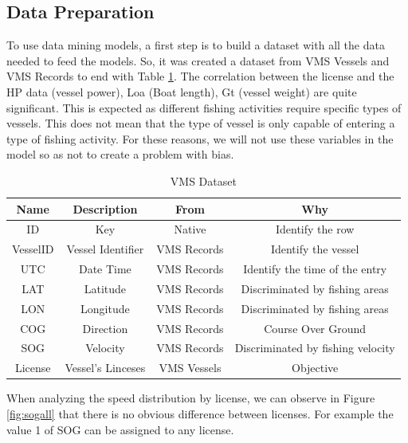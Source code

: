 \subsection{Data Preparation} %
\label{sub:data_preparation}
To use data mining models, a first step is to build a dataset with all the data needed to feed the models. So, it was created a dataset from VMS Vessels and VMS Records to end with Table \ref{table:vms_dataset}. 
The correlation between the license and the HP data (vessel power), Loa (Boat length), Gt (vessel weight) are quite significant. This is expected as different fishing activities require specific types of vessels. This does not mean that the type of vessel is only capable of entering a type of fishing activity.
For these reasons, we will not use these variables in the model so as not to create a problem with bias.

\begin {table}[H]
\caption {VMS Dataset}
\begin{center}
\begin{tabular}{c|c|c|c}
\textbf{Name } & \textbf{Description} & \textbf{From} & \textbf{Why} \\
\hline
ID & Key & Native & Identify the row \\
VesselID & Vessel Identifier & VMS Records & Identify the vessel \\
UTC & Date Time & VMS Records &Identify the time of the entry\\
LAT & Latitude & VMS Records & Discriminated by fishing areas\\
LON & Longitude & VMS Records & Discriminated by fishing areas\\
COG & Direction & VMS Records & Course Over Ground\\
SOG & Velocity & VMS Records & Discriminated by fishing velocity\\
License & Vessel's Linceses & VMS Vessels & Objective
\label{table:vms_dataset}
\end{tabular}
\end{center}
\end {table}



When analyzing the speed distribution by license, we can observe in Figure \ref{fig:sogall} that there is no obvious difference between licenses. For example the value 1 of SOG can be assigned to any license.

